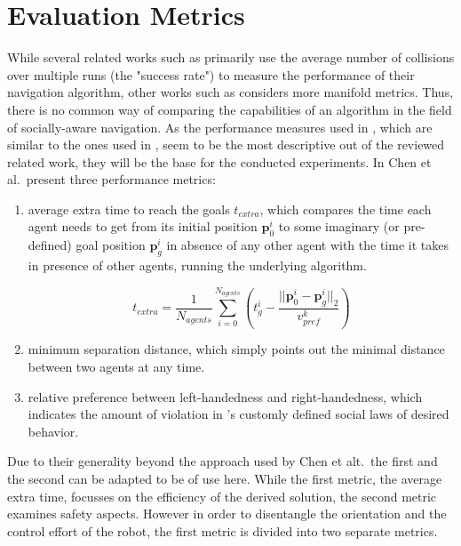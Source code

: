 \section{Evaluation Metrics}
\label{text:experiments/metrics}
While several related works such as \cite{Everett2018}\cite{Vemula2016}\cite{Luo2018a}\cite{Phillips2011} primarily use the average number of collisions over multiple runs (the "success rate") to measure the performance of their navigation algorithm, other works such as \cite{Chen2017}\cite{Nishimura2020a} considers more manifold metrics. Thus, there is no common way of comparing the capabilities of an algorithm in the field of socially-aware navigation. As the performance measures used in \cite{Chen2017},  which are similar to the ones used in \cite{Nishimura2020a}, seem to be the most descriptive out of the reviewed related work, they will be the base for the conducted experiments. In \cite{Chen2017} Chen et al.\ present three performance metrics: 

\begin{enumerate}
\item average extra time to reach the goals $t_{extra}$, which compares the time each agent needs to get from its initial position $\boldsymbol{p}^i_0$ to some imaginary (or pre-defined) goal position $\boldsymbol{p}^i_g$ in absence of any other agent with the time it takes in presence of other agents, running the underlying algorithm.

\begin{equation}
t_{extra} = \frac{1}{N_{agents}} \sum_{i=0}^{N_{agents}} \left( t_g^i - \frac{||\boldsymbol{p}^i_0 - \boldsymbol{p}^i_g||_2}{v^k_{pref}} \right)
\label{eq:t_extra}
\end{equation}

\item minimum separation distance, which simply points out the minimal distance between two agents at any time.
\item relative preference between left-handedness and right-handedness, which indicates the amount of violation in \cite{Chen2017}'s customly defined social laws of desired behavior.
\end{enumerate}

Due to their generality beyond the approach used by Chen et alt.\, the first and the second can be adapted to be of use here. While the first metric, the average extra time, focusses on the efficiency of the derived solution, the second metric examines safety aspects. However in order to disentangle the orientation and the control effort of the robot, the first metric is divided into two separate metrics. \\

